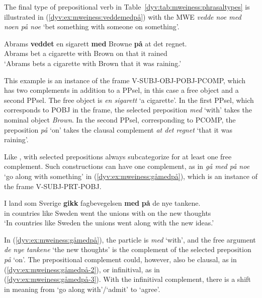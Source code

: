 \documentclass[output=paper]{langsci/langscibook}
\begin{document}
The final type of prepositional verb in Table~\ref{dyv:tab:mweiness:phrasaltypes} is illustrated in (\ref{dyv:ex:mweiness:veddemedpå}) with the MWE \emph{vedde noe med noen på noe} `bet something with someone on something'. 

\ea\label{dyv:ex:mweiness:veddemedpå}
\gll   Abrams \textbf{veddet} en sigarett \textbf{med} Browne \textbf{på} at det regnet. \\
        Abrams bet a cigarette with Brown on that it rained \\
\glt `Abrams bets a cigarette with Brown that it {was raining}.' \\ 
\z

This example is an instance of the frame \textsf{V-SUBJ-OBJ-POBJ-PCOMP}, which has two complements in addition to a \textsf{PPsel}, in this case a free object and a second \textsf{PPsel}.
The free object is \emph{en sigarett} `a cigarette'.
In the first \textsf{PPsel}, which corresponds to \textsf{POBJ} in the  frame, the selected preposition \emph{med} `with' takes the nominal object \emph{Brown}. 
In the second \textsf{PPsel}, corresponding to \textsf{PCOMP},  the preposition \emph{på} `on' takes the clausal complement \emph{at det regnet} `that it was raining'.

Like ,  with selected prepositions always subcategorize for at least one free complement. 
Such constructions can have one complement, as in \emph{gå med på noe} `go along with something' in (\ref{dyv:ex:mweiness:gåmedpå}), which is an instance of the frame \textsf{V-SUBJ-PRT-POBJ}.
 
\ea\label{dyv:ex:mweiness:gåmedpå}
\gll   I land som Sverige \textbf{gikk} fagbevegelsen \textbf{med} \textbf{på} de nye tankene. \\
        in countries like Sweden went {the unions} with on the new thoughts \\
\glt `In countries like Sweden the unions went along with the new ideas.' \\
\z

In (\ref{dyv:ex:mweiness:gåmedpå}), the particle is \emph{med} `with', and the free argument  \emph{de nye tankene} `the new thoughts' is the complement of the selected preposition \emph{på} `on'.  
The prepositional complement could, however, also be clausal, as in (\ref{dyv:ex:mweiness:gåmedpå-2}), or infinitival, as in (\ref{dyv:ex:mweiness:gåmedpå-3}).
With the infinitival complement, there is a shift in meaning from `go along with'/`admit' to `agree'. 
\end{document}
